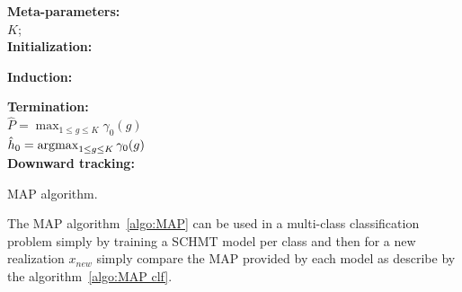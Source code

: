 \documentclass[a4paper,11pt]{report}
\begin{document}
		\begin{center}
			\begin{algorithm}
				\textbf{Meta-parameters:}\\
					$K$;\\
					
				\textbf{Initialization:}\\
					
				\textbf{Induction:}\\
				
				\textbf{Termination:}\\
					$\hat{P} = \max_{1\leq g \leq K} \gamma_{0}(g)$\\
					$\hat{h}_{0} = \mathop{\rm argmax}_{1\leq g \leq K} \gamma_{0}(g)$\\
				
				\textbf{Downward tracking:}\\
				
				\caption{MAP algorithm.}
				\label{algo:MAP}
			\end{algorithm}        
		\end{center}
		
		The MAP algorithm~\ref{algo:MAP} can be used in a multi-class classification problem simply by training a SCHMT model per class and then for a new realization $x_{new}$ simply compare the MAP provided by each model as describe by the algorithm~\ref{algo:MAP clf}.
		
\end{document}

